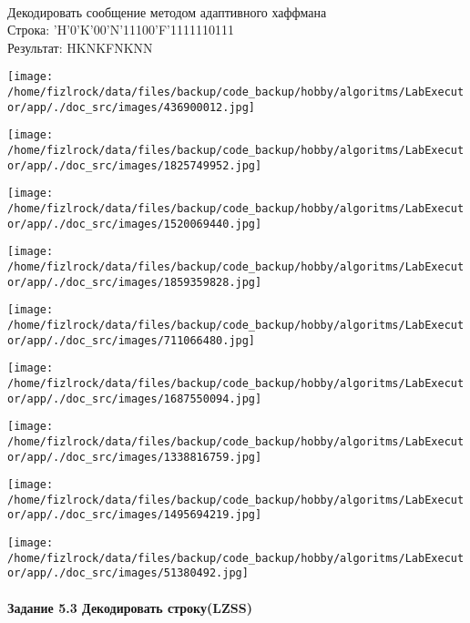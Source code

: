 \documentclass[a4paper, 12pt]{article}
\begin{document}
\\ 

Декодировать сообщение методом адаптивного хаффмана \\
Строка: 
'H'0'K'00'N'11100'F'1111110111\\
Результат: HKNKFNKNN

\texttt{[image: /home/fizlrock/data/files/backup/code\_backup/hobby/algoritms/LabExecutor/app/./doc\_src/images/436900012.jpg]}

\texttt{[image: /home/fizlrock/data/files/backup/code\_backup/hobby/algoritms/LabExecutor/app/./doc\_src/images/1825749952.jpg]}

\texttt{[image: /home/fizlrock/data/files/backup/code\_backup/hobby/algoritms/LabExecutor/app/./doc\_src/images/1520069440.jpg]}

\texttt{[image: /home/fizlrock/data/files/backup/code\_backup/hobby/algoritms/LabExecutor/app/./doc\_src/images/1859359828.jpg]}

\texttt{[image: /home/fizlrock/data/files/backup/code\_backup/hobby/algoritms/LabExecutor/app/./doc\_src/images/711066480.jpg]}

\texttt{[image: /home/fizlrock/data/files/backup/code\_backup/hobby/algoritms/LabExecutor/app/./doc\_src/images/1687550094.jpg]}

\texttt{[image: /home/fizlrock/data/files/backup/code\_backup/hobby/algoritms/LabExecutor/app/./doc\_src/images/1338816759.jpg]}

\texttt{[image: /home/fizlrock/data/files/backup/code\_backup/hobby/algoritms/LabExecutor/app/./doc\_src/images/1495694219.jpg]}

\texttt{[image: /home/fizlrock/data/files/backup/code\_backup/hobby/algoritms/LabExecutor/app/./doc\_src/images/51380492.jpg]}
\pagebreak
\paragraph{Задание 5.3 Декодировать строку(LZSS)\\}
\end{document}
